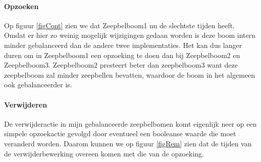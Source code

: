 \documentclass[12pt,hidelinks]{article}
\begin{document}
    \paragraph{Opzoeken}
    Op figuur \ref{figCont} zien we dat Zeepbelboom1 nu de slechtste tijden heeft.
    Omdat er hier zo weinig mogelijk wijzigingen gedaan worden is deze boom intern minder gebalanceerd dan de andere twee implementaties.
    Het kan dus langer duren om in Zeepbelboom1 een opzoeking te doen dan bij Zeepbelboom2 en Zeepbelboom3.
    Zeepbelboom2 presteert beter dan zeepbelboom3 want deze zeepbelboom zal minder zeepbellen bevatten, waardoor de boom in het algemeen ook gebalanceerder is.
    \paragraph{Verwijderen}
    De verwijderactie in mijn gebalanceerde zeepbelbomen komt eigenlijk neer op een simpele opzoekactie gevolgd door eventueel een booleanse waarde die moet veranderd worden.
    Daarom kunnen we op figuur \ref{figRem} zien dat de tijden van de verwijderbewerking overeen komen met die van de opzoeking.
    
\end{document}
